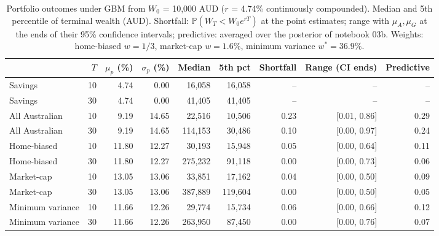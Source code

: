 \begin{table}
\caption{Portfolio outcomes under GBM from $W_0$ = 10,000 AUD ($r$ = 4.74\% continuously compounded). Median and 5th percentile of terminal wealth (AUD). Shortfall: $\mathbb{P}(W_T < W_0e^{rT})$ at the point estimates; range with $\mu_A,\mu_G$ at the ends of their 95\% confidence intervals; predictive: averaged over the posterior of notebook 03b. Weights: home-biased $w=1/3$, market-cap $w=1.6\%$, minimum variance $w^*=36.9\%$.}
\label{tab:portfolios}
\begin{tabular}{lrrrrrrrr}
\toprule
 & $T$ & $\mu_p$ (\%) & $\sigma_p$ (\%) & Median & 5th pct & Shortfall & Range (CI ends) & Predictive \\
\midrule
Savings & 10 & 4.74 & 0.00 & 16,058 & 16,058 & -- & -- & -- \\
Savings & 30 & 4.74 & 0.00 & 41,405 & 41,405 & -- & -- & -- \\
All Australian & 10 & 9.19 & 14.65 & 22,516 & 10,506 & 0.23 & [0.01, 0.86] & 0.29 \\
All Australian & 30 & 9.19 & 14.65 & 114,153 & 30,486 & 0.10 & [0.00, 0.97] & 0.24 \\
Home-biased & 10 & 11.80 & 12.27 & 30,193 & 15,948 & 0.05 & [0.00, 0.64] & 0.11 \\
Home-biased & 30 & 11.80 & 12.27 & 275,232 & 91,118 & 0.00 & [0.00, 0.73] & 0.06 \\
Market-cap & 10 & 13.05 & 13.06 & 33,851 & 17,162 & 0.04 & [0.00, 0.50] & 0.09 \\
Market-cap & 30 & 13.05 & 13.06 & 387,889 & 119,604 & 0.00 & [0.00, 0.50] & 0.05 \\
Minimum variance & 10 & 11.66 & 12.26 & 29,774 & 15,734 & 0.06 & [0.00, 0.66] & 0.12 \\
Minimum variance & 30 & 11.66 & 12.26 & 263,950 & 87,450 & 0.00 & [0.00, 0.76] & 0.07 \\
\bottomrule
\end{tabular}
\end{table}
